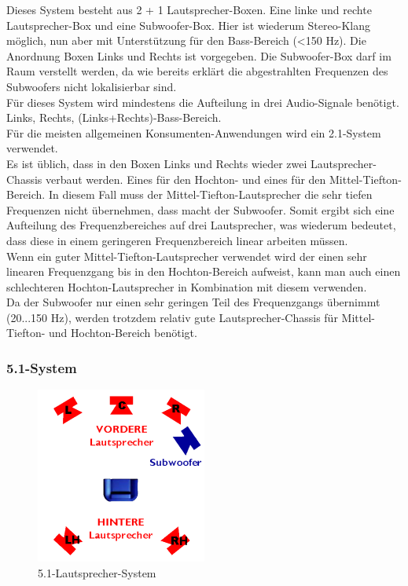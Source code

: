 Dieses System besteht aus 2 + 1 Lautsprecher-Boxen.
Eine linke und rechte Lautsprecher-Box und eine Subwoofer-Box.
Hier ist wiederum Stereo-Klang möglich, nun aber mit Unterstützung für den Bass-Bereich (<150 Hz).
Die Anordnung Boxen Links und Rechts ist vorgegeben.
Die Subwoofer-Box darf im Raum verstellt werden, da wie bereits erklärt die abgestrahlten Frequenzen des Subwoofers nicht lokalisierbar sind.\\
Für dieses System wird mindestens die Aufteilung in drei Audio-Signale benötigt.
Links, Rechts, (Links+Rechts)-Bass-Bereich.\\
Für die meisten allgemeinen Konsumenten-Anwendungen wird ein 2.1-System verwendet.\\ 
Es ist üblich, dass in den Boxen Links und Rechts wieder zwei Lautsprecher-Chassis verbaut werden.
Eines für den Hochton- und eines für den Mittel-Tiefton-Bereich.
In diesem Fall muss der Mittel-Tiefton-Lautsprecher die sehr tiefen Frequenzen nicht übernehmen, dass macht der Subwoofer.
Somit ergibt sich eine Aufteilung des Frequenzbereiches auf drei Lautsprecher, was wiederum bedeutet, dass diese in einem geringeren Frequenzbereich linear arbeiten müssen.\\
Wenn ein guter Mittel-Tiefton-Lautsprecher verwendet wird der einen sehr linearen Frequenzgang bis in den Hochton-Bereich aufweist, kann man auch einen schlechteren Hochton-Lautsprecher in Kombination mit diesem verwenden.\\
Da der Subwoofer nur einen sehr geringen Teil des Frequenzgangs übernimmt (20...150 Hz), werden trotzdem relativ gute Lautsprecher-Chassis für Mittel-Tiefton- und Hochton-Bereich benötigt.



\subsubsection*{5.1-System}
\begin{figure} [H]
	\centering
	\includegraphics[width=0.5\textwidth]{img/Grundlagen/Mehrweg-Lautsprechersysteme/DOLBYDigital51-cut.jpg}
	\caption{5.1-Lautsprecher-System}
	\label{fig:3.2.6}
\end{figure}


